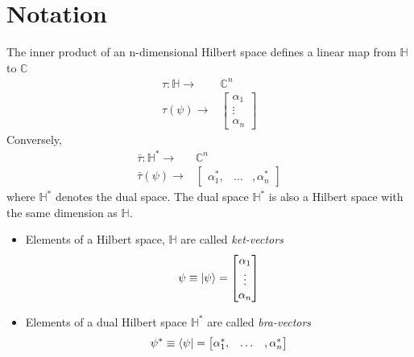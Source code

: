 \section{Notation}
\begin{definition}
The inner product of an n-dimensional Hilbert space defines a linear map from $\mathbb{H}$ to $\mathbb{C}$
\begin{align*}
  \tau: \mathbb{H}\longrightarrow& \mathbb{C}^{n} \\
  \tau(\psi) \longrightarrow& \begin{bmatrix}
           \alpha_{1} \\
           \vdots \\
           \alpha_{n}
         \end{bmatrix}
\end{align*}  
Conversely, 
\begin{align*}
  \bar{\tau}: \mathbb{H}^{*}\longrightarrow& \mathbb{C}^{n} \\
  \bar{\tau}(\psi) \longrightarrow& \begin{bmatrix}
           \alpha_{1}^{*}, & \hdots &, \alpha_{n}^{*}
         \end{bmatrix}
\end{align*}  
where $\mathbb{H}^{*}$ denotes the dual space. The dual space $\mathbb{H}^{*}$ is also a Hilbert space with the same dimension as $\mathbb{H}$. \\
\begin{itemize}
    \item Elements of a Hilbert space, $\mathbb{H}$ are called \textit{ket-vectors} 
\begin{equation}
    \psi \equiv \ket{\psi} =  \begin{bmatrix}
           \alpha_{1} \\
           \vdots \\
           \alpha_{n}
         \end{bmatrix}
\end{equation}
\item Elements of a dual Hilbert space $\mathbb{H}^{*}$ are called \textit{bra-vectors}
\begin{equation}
    \psi^{*} \equiv \bra{\psi} =  \begin{bmatrix}
           \alpha_{1}^{*}, & \hdots &, \alpha_{n}^{*}
         \end{bmatrix}
\end{equation}
\end{itemize}
\end{definition}
